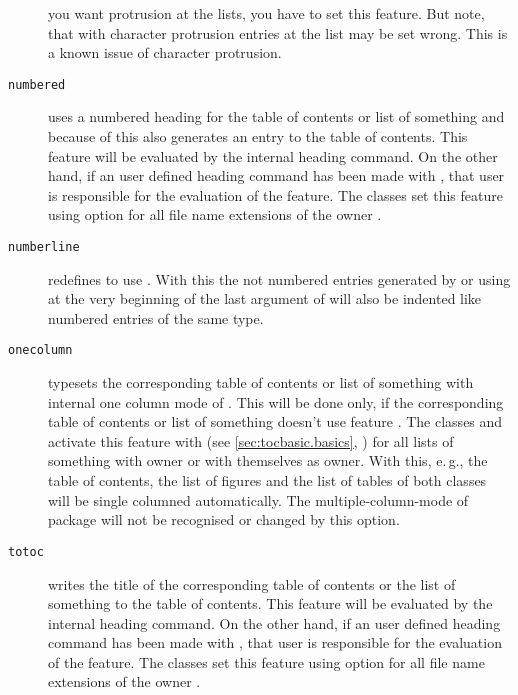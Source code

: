 \begin{description}
  you want protrusion at the lists, you have to set this feature. But
  note, that with character protrusion entries at the
  list may be set wrong. This is a known issue of character protrusion.
\item[\texttt{numbered}] uses a numbered heading for the table of contents or
  list of something and because of this also generates an entry to the table
  of contents. This feature will be evaluated by the internal heading
  command. On the other hand, if an user defined heading command has been made
  with , that user is responsible for the evaluation of
  the feature. The \KOMAScript{} classes set this feature using option
   for all file name extensions of the
  owner .
\item[\texttt{numberline}] \leavevmode{}%
  redefines  to use . With this the not
  numbered entries generated by \KOMAScript{} or using  at
  the very beginning of the last argument of  will also
  be indented like numbered entries of the same type.
\item[\texttt{onecolumn}] \leavevmode{}%
  typesets the corresponding table of contents or list of something with
  internal one column mode of
  . This will be
  done only, if the corresponding table of contents or list of something
  doesn't use feature . The
  \KOMAScript{} classes  and  activate this
  feature with  (see \autoref{sec:tocbasic.basics},
  ) for all lists of something
  with owner  or with themselves as owner. With this, e.\,g.,
  the table of contents, the list of figures and the list of tables of both
  classes will be single columned automatically. The multiple-column-mode of
  package  will not be recognised or
  changed by this option.
\item[\texttt{totoc}] writes the title of the corresponding table of contents
  or the list of something to the table of contents. This feature will be
  evaluated by the internal heading command. On the other hand, if an user
  defined heading command has been made with , that user
  is responsible for the evaluation of the feature. The \KOMAScript{} classes
  set this feature using option
   for all file name extensions of the
  owner .
\end{description}
